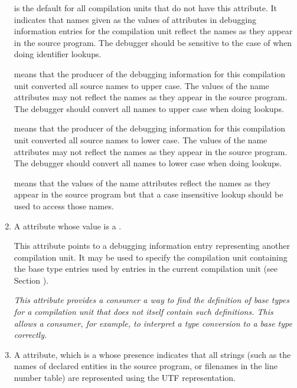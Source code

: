 \begin{enumerate}[1. ]
\DWIDcasesensitiveTARG{} is the default for all compilation units
that do not have this attribute.  It indicates that names given
as the values of \DWATname{} attributes 
in debugging information
entries for the compilation unit reflect the names as they
appear in the source program. The debugger should be sensitive
to the case of  when doing identifier 
lookups.

\DWIDupcaseTARG{} means that the 
producer of the debugging
information for this compilation unit converted all source
names to upper case. The values of the name attributes may not
reflect the names as they appear in the source program. The
debugger should convert all names to upper case when doing
lookups.

\DWIDdowncaseTARG{} means that 
the producer of the debugging
information for this compilation unit converted all source
names to lower case. The values of the name attributes may not
reflect the names as they appear in the source program. The
debugger should convert all names to lower case when doing
lookups.

\DWIDcaseinsensitiveTARG{} means that the values of the name
attributes reflect the names as they appear in the source
program but that a case insensitive lookup should be used to
access those names.

\item A \DWATbasetypes{} attribute whose value is a 
.

This 
\hypertarget{chap:DWATbasetypesprimitivedatatypesofcompilationunit}{}
attribute 
points to a debugging information entry
representing another compilation unit.  It may be used
to specify the compilation unit containing the base type
entries used by entries in the current compilation unit
(see Section ).

\textit{This attribute provides a consumer a way to find the definition
of base types for a compilation unit that does not itself
contain such definitions. This allows a consumer, for example,
to interpret a type conversion to a base type 
\hypertarget{chap:DWATuseUTF8compilationunitusesutf8strings}{}
correctly.}

\item A \DWATuseUTFeight{} attribute,
which is a  whose
presence indicates that all strings (such as the names of
declared entities in the source program, or filenames in the line number table) 
are represented using the UTF representation. 


\end{enumerate}
